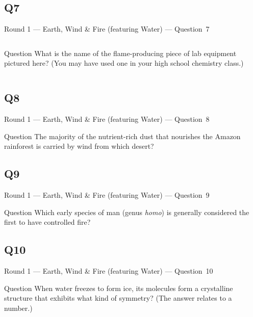 \documentclass[11pt]{beamer}
\begin{document}
\subsection*{Q7}
\begin{frame}[t]{Round 1 --- Earth, Wind \& Fire (featuring Water) --- \mbox{Question 7}}
\vspace{-0.5em}
\begin{columns}[T,totalwidth=\linewidth]
\begin{column}{0.32\linewidth}
\begin{block}{Question}
What is the name of the flame-producing piece of lab equipment pictured here? (You may have used one in your high school chemistry class.)
\end{block}
\end{column}
\begin{column}{0.65\linewidth}
\begin{center}
\texttt{[image: \{Images/bunsen]}.jpeg}
\end{center}
\end{column}
\end{columns}
\end{frame}
\subsection*{Q8}
\begin{frame}[t]{Round 1 --- Earth, Wind \& Fire (featuring Water) --- \mbox{Question 8}}
\vspace{-0.5em}
\begin{block}{Question}
The majority of the nutrient-rich dust that nourishes the Amazon rainforest is carried by wind from which desert?
\end{block}
\end{frame}
\subsection*{Q9}
\begin{frame}[t]{Round 1 --- Earth, Wind \& Fire (featuring Water) --- \mbox{Question 9}}
\vspace{-0.5em}
\begin{block}{Question}
Which early species of man (genus \emph{homo}) is generally considered the first to have controlled fire?
\end{block}
\end{frame}
\subsection*{Q10}
\begin{frame}[t]{Round 1 --- Earth, Wind \& Fire (featuring Water) --- \mbox{Question 10}}
\vspace{-0.5em}
\begin{block}{Question}
When water freezes to form ice, its molecules form a crystalline structure that exhibits what kind of symmetry? (The answer relates to a number.)
\end{block}
\end{frame}
\end{document}
